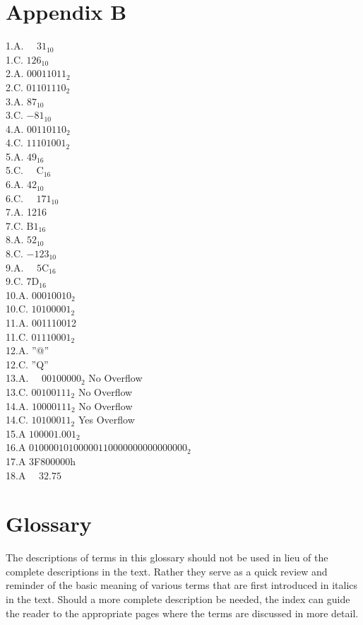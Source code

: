 \documentclass[10pt]{article}
\begin{document}
\section*{Appendix B}
1.A. $\quad 31_{10}$\\
1.C. $126_{10}$\\
2.A. $00011011_{2}$\\
2.C. $01101110_{2}$\\
3.A. $87_{10}$\\
3.C. $-81_{10}$\\
4.A. $00110110_{2}$\\
4.C. $11101001_{2}$\\
5.A. $49_{16}$\\
5.C. $\quad \mathrm{C}_{16}$\\
6.A. $42_{10}$\\
6.C. $\quad 171_{10}$\\
7.A. 1216\\
7.C. $\mathrm{B} 1_{16}$\\
8.A. $52_{10}$\\
8.C. $-123_{10}$\\
9.A. $\quad 5 \mathrm{C}_{16}$\\
9.C. $7 \mathrm{D}_{16}$\\
10.A. $00010010_{2}$\\
10.C. $10100001_{2}$\\
11.A. 001110012\\
11.C. $01110001_{2}$\\
12.A. ''@''\\
12.C. ''Q''\\
13.A. $\quad 00100000_{2}$ No Overflow\\
13.C. $00100111_{2}$ No Overflow\\
14.A. $10000111_{2}$ No Overflow\\
14.C. $10100011_{2}$ Yes Overflow\\
15.A $100001.001_{2}$\\
16.A $01000010100000110000000000000000_{2}$\\
17.A 3F800000h\\
18.A $\quad 32.75$

\section*{Glossary}
The descriptions of terms in this glossary should not be used in lieu of the complete descriptions in the text. Rather they serve as a quick review and reminder of the basic meaning of various terms that are first introduced in italics in the text. Should a more complete description be needed, the index can guide the reader to the appropriate pages where the terms are discussed in more detail.
\end{document}
